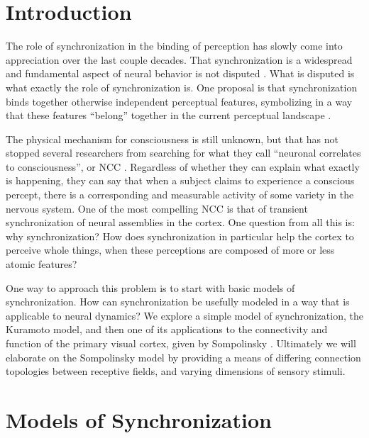 \documentclass[12pt]{article}
\begin{document}
\maketitle

\section{Introduction}

The role of synchronization in the binding of perception has slowly come into appreciation over the last couple decades.  That synchronization is a widespread and fundamental aspect of neural behavior is not disputed \cite{Buzsaki}.  What is disputed is what exactly the role of synchronization is.  One proposal is that synchronization binds together otherwise independent perceptual features, symbolizing in a way that these features ``belong'' together in the current perceptual landscape \cite{Melloni}.  

The physical mechanism for consciousness is still unknown, but that has not stopped several researchers from searching for what they call ``neuronal correlates to consciousness'', or NCC \cite{Rees}.  Regardless of whether they can explain what exactly is happening, they can say that when a subject claims to experience a conscious percept, there is a corresponding and measurable activity of some variety in the nervous system.  One of the most compelling NCC is that of transient synchronization of neural assemblies in the cortex.  One question from all this is: why synchronization?  How does synchronization in particular help the cortex to perceive whole things, when these perceptions are composed of more or less atomic features?  

One way to approach this problem is to start with basic models of synchronization.  How can synchronization be usefully modeled in a way that is applicable to neural dynamics?  We explore a simple model of synchronization, the Kuramoto model, and then one of its applications to the connectivity and function of the primary visual cortex, given by Sompolinsky \cite{Sompolinsky}.  Ultimately we will elaborate on the Sompolinsky model by providing a means of differing connection topologies between receptive fields, and varying dimensions of sensory stimuli.

\section{Models of Synchronization}
\end{document}
